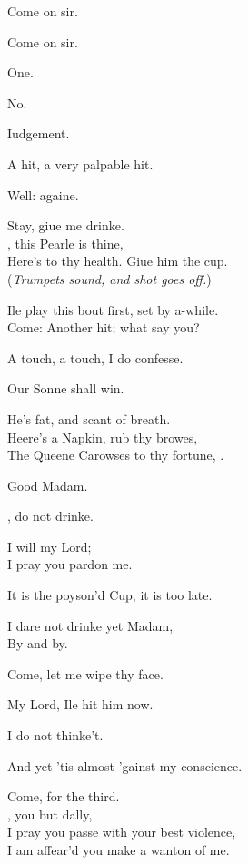 \documentclass[a5paper,DIV=calc,11pt]{scrbook}
\begin{document}
\begin{drama*}
    \hamspeaks Come on sir.
    
    \laerspeaks Come on sir.
    
    
    \hamspeaks One.
    
    \laerspeaks No.
    
    \hamspeaks Iudgement.
    
    \osrspeaks A hit, a very palpable hit.
    
    \laerspeaks Well: againe.
    
    \kingspeaks Stay, giue me drinke.\\
    \ham, this Pearle is thine,\\
    Here's to thy health. Giue him the cup.\\
    (\textit{Trumpets sound, and shot goes off.})
    
    \hamspeaks Ile play this bout first, set by a-while.\\
    Come: Another hit; what say you?
    
    \laerspeaks A touch, a touch, I do confesse.
    
    \kingspeaks Our Sonne shall win.
    
    \queenspeaks He's fat, and scant of breath.\\
    Heere's a Napkin, rub thy browes,\\
    The Queene Carowses to thy fortune, \ham.
    
    \hamspeaks Good Madam.
    
    \kingspeaks \queen, do not drinke.
    
    \queenspeaks I will my Lord;\\
    I pray you pardon me.
    
    \kingspeaks It is the poyson'd Cup, it is too late.
    
    \hamspeaks I dare not drinke yet Madam,\\
    By and by.
    
    \queenspeaks Come, let me wipe thy face.
    
    \laerspeaks My Lord, Ile hit him now.
    
    \kingspeaks I do not thinke't.
    
    \laerspeaks And yet 'tis almost 'gainst my conscience.
    
    \hamspeaks Come, for the third.\\
    \laer, you but dally,\\
    I pray you passe with your best violence,\\
    I am affear'd you make a wanton of me.
    

\end{drama*}
\end{document}
